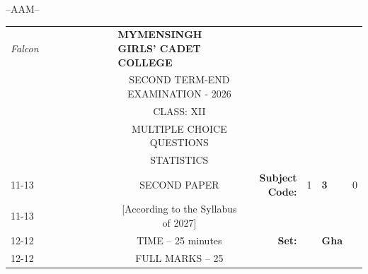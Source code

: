 \documentclass[12pt]{exam}
\begin{document}
\vspace{1cm}
\begin{center}
\vfill 
--AAM--
\end{center}

\newpage


\begin{table}[]
\begin{tabular}{llllllllcllll}
\textit{Falcon} &  &  &  &  &  &  &  & \multicolumn{1}{l}{\textbf{MYMENSINGH GIRLS' CADET COLLEGE}} &                                             &                        &                                 &                        \\
                &  &  &  &  &  &  &  & \multicolumn{1}{c}{SECOND TERM-END EXAMINATION - 2026}       &                                             &                        & \multicolumn{1}{c}{}            &                        \\
                &  &  &  &  &  &  &  & CLASS: XII                                                   &                                             &                        & \multicolumn{1}{c}{}            &                        \\
                &  &  &  &  &  &  &  & MULTIPLE CHOICE QUESTIONS                                    &                                             &                        & \multicolumn{1}{c}{}            &                        \\
                &  &  &  &  &  &  &  & STATISTICS                                                   &                                             &                        & \multicolumn{1}{r}{}            &                        \\ \cline{11-13} 
                &  &  &  &  &  &  &  & SECOND PAPER                                                 & \multicolumn{1}{r|}{\textbf{Subject Code:}} & \multicolumn{1}{l|}{1} & \multicolumn{1}{l|}{\textbf{3}} & \multicolumn{1}{l|}{0} \\ \cline{11-13} 
                &  &  &  &  &  &  &  & [According to the Syllabus of 2027]                          & \multicolumn{1}{r}{}                        &                        &                                 &                        \\ \cline{12-12}
                &  &  &  &  &  &  &  & TIME – 25 minutes                                            & \multicolumn{1}{r}{\textbf{Set:}}           & \multicolumn{1}{l|}{}  & \multicolumn{1}{l|}{\textbf{Gha}} &                        \\ \cline{12-12}
                &  &  &  &  &  &  &  & FULL MARKS – 25                                              &                                             &                        &                                 &                       
\end{tabular}
\end{table}
\end{document}
